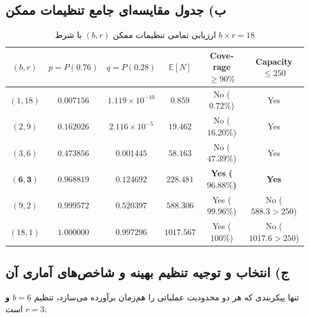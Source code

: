 \documentclass[11pt,a4paper]{article}
\begin{document}
	\subsection{ب) جدول مقایسه‌ای جامع تنظیمات ممکن}
	
	\begin{table}[H]
		\centering
		\small
		\renewcommand{\arraystretch}{1.20}
		\caption{ارزیابی تمامی تنظیمات ممکن $(b, r)$ با شرط $b \times r = 18$}
		\vspace{0.12cm}
		\begin{latin}
			\begin{tabular}{cccccc}
				\toprule
				\rowcolor{headerBg}
				$(b, r)$ & $p = P(0.76)$ & $q = P(0.28)$ & $\mathbb{E}[N]$ & Coverage $\ge 90\%$ & Capacity $\le 250$ \\
				\midrule
				$(1, 18)$ & $0.007156$ & $1.119 \times 10^{-10}$ & $0.859$ & No ($0.72\%$) & Yes \\
				$(2, 9)$  & $0.162026$ & $2.116 \times 10^{-5}$  & $19.462$ & No ($16.20\%$) & Yes \\
				$(3, 6)$  & $0.473856$ & $0.001445$ & $58.163$ & No ($47.39\%$) & Yes \\
				\rowcolor{highlightRow}
				$\mathbf{(6, 3)}$ & $\mathbf{0.968819}$ & $\mathbf{0.124692}$ & $\mathbf{228.481}$ & \textbf{Yes ($96.88\%$)} & \textbf{Yes} \\
				$(9, 2)$  & $0.999572$ & $0.520397$ & $588.306$ & Yes ($99.96\%$) & No ($588.3 > 250$) \\
				$(18, 1)$ & $1.000000$ & $0.997296$ & $1017.567$ & Yes ($100\%$) & No ($1017.6 > 250$) \\
				\bottomrule
			\end{tabular}
		\end{latin}
	\end{table}
	
	\subsection{ج) انتخاب و توجیه تنظیم بهینه و شاخص‌های آماری آن}
	تنها پیکربندی که هر دو محدودیت عملیاتی را هم‌زمان برآورده می‌سازد، تنظیم \textbf{$b=6$ و $r=3$} است:
	
\end{document}
